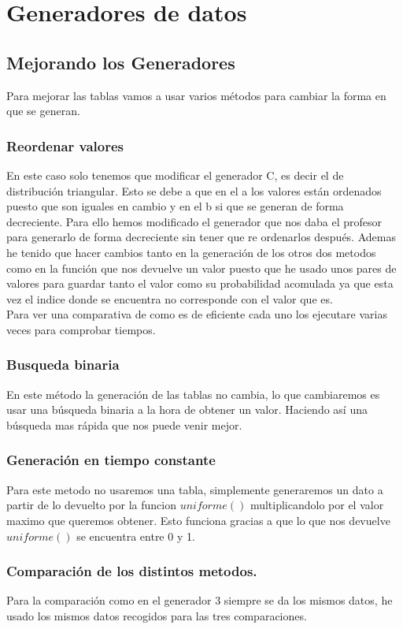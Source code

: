 \documentclass[12pt,a4paper]{article}
\begin{document}
\section{Generadores de datos}
\subsection{Mejorando los Generadores}
Para mejorar las tablas vamos a usar varios métodos para cambiar la forma en que se generan.
\subsubsection{Reordenar valores}
En este caso solo tenemos que modificar el generador C, es decir el de distribución triangular. Esto se debe a que en el a los valores están ordenados puesto que son iguales en cambio y en el b si que se generan de forma decreciente. Para ello hemos modificado el generador que nos daba el profesor para generarlo de forma decreciente sin tener que re ordenarlos después. Ademas he tenido que hacer cambios tanto en la generación de los otros dos metodos como en la función que nos devuelve un valor puesto que he usado unos pares de valores para guardar tanto el valor como su probabilidad acomulada ya que esta vez el indice donde se encuentra no corresponde con el valor que es. \\ Para ver una comparativa de como es de eficiente cada uno los ejecutare varias veces para comprobar tiempos.
\subsubsection{Busqueda binaria}
En este método la generación de las tablas no cambia, lo que cambiaremos es usar una búsqueda binaria a la hora de obtener un valor. Haciendo así una búsqueda mas rápida que nos puede venir mejor. 
\subsubsection{Generación en tiempo constante}
Para este metodo no usaremos una tabla, simplemente generaremos un dato a partir de lo devuelto por la funcion $uniforme()$ multiplicandolo por el valor maximo que queremos obtener. Esto funciona gracias a que lo que nos devuelve $uniforme()$ se encuentra entre 0 y 1.
\subsubsection{Comparación de los distintos metodos.}
Para la comparación como en el generador 3 siempre se da los mismos datos, he usado los mismos datos recogidos para las tres comparaciones. 
\end{document}
